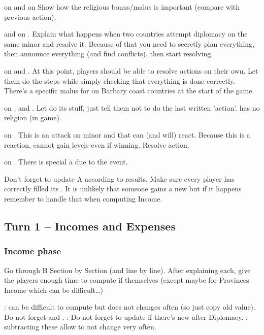 \aparag \POR on \paysMaroc and \VEN on \paysPerse
\bparag Show how the religious bonus/malus is important (compare with previous
action).

\aparag \RUS and \TUR on \paysKazan.
\bparag Explain what happens when two countries attempt diplomacy on the same
minor and resolve it.
\bparag Because of that you need to secretly plan everything, then announce
everything (and find conflicts), then start resolving.

\aparag \TUR on \paysAlgerie and \paysDamas.
\bparag At this point, players should be able to resolve actions on their
own. Let them do the steps while simply checking that everything is done
correctly.
\bparag There's a  specific malus for \TUR on Barbary coast
countries at the start of the game.

\aparag \HIS on \paysPapaute, \paysSuisse and \paysLorraine.
\bparag Let \HIS do its stuff, just tell them not to do the last written
'action'.
\bparag \paysSuisse has no religion (in game).

\aparag \FRA on \paysGenes.
\bparag This is an attack on \HIS minor and that \HIS can (and will)
react. Because this is a reaction, \HIS cannot gain levels even if winning.
\bparag Resolve action.

\aparag \FRA on \paysToscane.
\bparag There is special a  due to the event.

\aparag Don't forget to update \EcoRS A according to results. Make sure every
player has correctly filled its .
\bparag It is unlikely that someone gains a new \VASSAL but if it happens
remember to handle that when computing Income.

\subsection{Turn 1 -- Incomes and Expenses}
\subsubsection{Income phase}
\aparag Go through \EcoRS B Section by Section (and line by line). After
explaining each, give the players enough time to compute if themselves (except
maybe for Provinces Income which can be difficult\ldots)

\bparag {}: can be difficult to compute but
does not changes often (so just copy old value). Do not forget \provinceAcores
and .
\bparag {}: Do not forget to update if
there's new \VASSAL after Diplomacy.
\bparag {}: subtracting these
allow to not change  very often.

